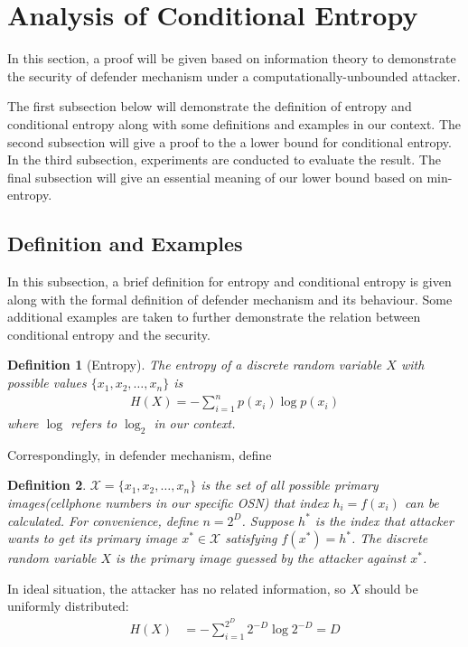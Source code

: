 \documentclass[10pt, conference, compsocconf]{IEEEtran}
\newtheorem{mydef}{Definition}
\begin{document}
\section{Analysis of Conditional Entropy}
	In this section, a proof
	will be given based on information theory to demonstrate the security of
	defender mechanism under
	a computationally-unbounded attacker.
	
	The first subsection below will demonstrate the definition
	of entropy and conditional entropy along with some
	definitions and examples in our context. The second subsection
	will give a proof to the a lower bound for conditional entropy. 
	In the third subsection, experiments
	are conducted to evaluate the result. The final subsection
	will give an essential meaning of our lower bound based on min-entropy.
	
	\subsection{Definition and Examples}
		In this subsection, a brief definition for entropy and conditional
		entropy is given along with the formal definition of defender mechanism
		and its behaviour.
		Some additional examples are taken to further
		demonstrate the relation between conditional entropy and
		the security.
		
		\begin{mydef}[Entropy]\label{def_entropy}
			The entropy of a discrete random variable $X$ with
			possible values $\{x_1, x_2, \ldots, x_n\}$ is
			\begin{align}
				H(X) = -\sum_{i=1}^n p(x_i)\log p(x_i)
			\end{align}
			where $\log$ refers to $\log_2$ in our context.
		\end{mydef}
		
		Correspondingly, in defender mechanism, define
		\begin{mydef}\label{def2}
			$\mathcal{X} = \{x_1, x_2, \ldots, x_n\}$ is the set of all possible 
			primary images(cellphone numbers
			in our specific OSN) that index $h_i = f(x_i)$ can be calculated.
			For convenience, define $n = 2^D$.
			Suppose $h^*$ is the index that attacker wants to
			get its primary image $x^* \in \mathcal{X}$ satisfying $f(x^*) = h^*$.
			The discrete random variable $X$ is the
			primary image guessed by the attacker against $x^*$. 
		\end{mydef}
		
		In ideal situation, the attacker has no related information, so $X$ should
		be uniformly distributed:
		\begin{align*}
			H(X) &= -\sum_{i=1}^{2^D} 2^{-D} \log 2^{-D}
				= D
		\end{align*}
		
\end{document}
